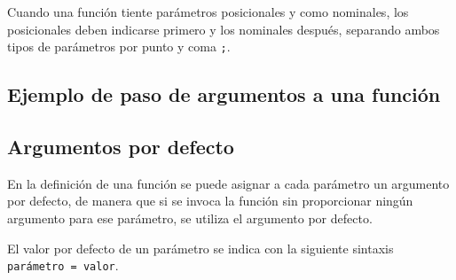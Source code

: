 \documentclass[
  letterpaper,
  DIV=11,
  numbers=noendperiod]{scrreprt}
\newenvironment{Shaded}{\begin{snugshade}}{\end{snugshade}}
\newcommand{\FloatTok}[1]{\textcolor[rgb]{0.68,0.00,0.00}{#1}}
\newcommand{\FunctionTok}[1]{\textcolor[rgb]{0.28,0.35,0.67}{#1}}
\newcommand{\KeywordTok}[1]{\textcolor[rgb]{0.00,0.23,0.31}{#1}}
\newcommand{\NormalTok}[1]{\textcolor[rgb]{0.00,0.23,0.31}{#1}}
\newcommand{\OperatorTok}[1]{\textcolor[rgb]{0.37,0.37,0.37}{#1}}
\newcommand{\SpecialCharTok}[1]{\textcolor[rgb]{0.37,0.37,0.37}{#1}}
\newcommand{\StringTok}[1]{\textcolor[rgb]{0.13,0.47,0.30}{#1}}
\begin{document}
Cuando una función tiente parámetros posicionales y como nominales, los
posicionales deben indicarse primero y los nominales después, separando
ambos tipos de parámetros por punto y coma \texttt{;}.

\hypertarget{ejemplo-de-paso-de-argumentos-a-una-funciuxf3n}{%
\subsection{Ejemplo de paso de argumentos a una
función}\label{ejemplo-de-paso-de-argumentos-a-una-funciuxf3n}}

\begin{Shaded}
\end{Shaded}

\hypertarget{argumentos-por-defecto}{%
\subsection{Argumentos por defecto}\label{argumentos-por-defecto}}

En la definición de una función se puede asignar a cada parámetro un
argumento por defecto, de manera que si se invoca la función sin
proporcionar ningún argumento para ese parámetro, se utiliza el
argumento por defecto.

El valor por defecto de un parámetro se indica con la siguiente sintaxis
\texttt{parámetro\ =\ valor}.
\end{document}
